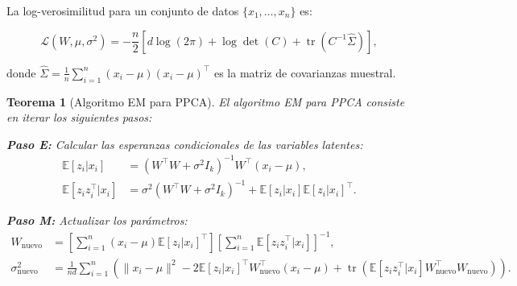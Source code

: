 \documentclass[11pt]{article}
\theoremstyle{plain}
\newtheorem{theorem}{Teorema}[section]
\begin{document}
La log-verosimilitud para un conjunto de datos $\{x_1, \ldots, x_n\}$ es:

\[
\mathcal{L}(W, \mu, \sigma^2) = -\frac{n}{2} \left[ d \log(2\pi) + \log \det(C) + \operatorname{tr}(C^{-1} \hat{\Sigma}) \right],
\]

donde $\hat{\Sigma} = \frac{1}{n} \sum_{i=1}^n (x_i - \mu)(x_i - \mu)^\top$ es la matriz de covarianzas muestral.

\begin{theorem}[Algoritmo EM para PPCA]
\label{thm:ppca_em}
El algoritmo EM para PPCA consiste en iterar los siguientes pasos:

\textbf{Paso E:} Calcular las esperanzas condicionales de las variables latentes:
\[
\begin{aligned}
\mathbb{E}[z_i | x_i] &= (W^\top W + \sigma^2 I_k)^{-1} W^\top (x_i - \mu), \\
\mathbb{E}[z_i z_i^\top | x_i] &= \sigma^2 (W^\top W + \sigma^2 I_k)^{-1} + \mathbb{E}[z_i | x_i] \mathbb{E}[z_i | x_i]^\top.
\end{aligned}
\]

\textbf{Paso M:} Actualizar los parámetros:
\[
\begin{aligned}
W_{\text{nuevo}} &= \left[ \sum_{i=1}^n (x_i - \mu) \mathbb{E}[z_i | x_i]^\top \right] \left[ \sum_{i=1}^n \mathbb{E}[z_i z_i^\top | x_i] \right]^{-1}, \\
\sigma^2_{\text{nuevo}} &= \frac{1}{nd} \sum_{i=1}^n \left( \|x_i - \mu\|^2 - 2 \mathbb{E}[z_i | x_i]^\top W_{\text{nuevo}}^\top (x_i - \mu) + \operatorname{tr}\left( \mathbb{E}[z_i z_i^\top | x_i] W_{\text{nuevo}}^\top W_{\text{nuevo}} \right) \right).
\end{aligned}
\]
\end{theorem}
\end{document}
